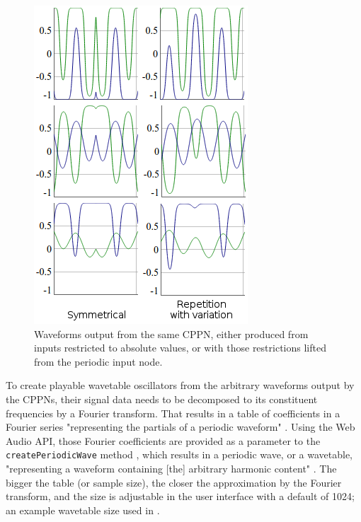 \documentclass[conference]{IEEEtran}
\begin{document}
\begin{figure}[htp]
	\centerline{\includegraphics[width=.8\columnwidth]{cppnSymmetryVsVariation.png}}
	\caption{Waveforms output from the same CPPN, either produced from inputs restricted to absolute values, or with those restrictions lifted from the periodic input node.}
	\label{fig:cppnVariation}
\end{figure}


To create playable wavetable oscillators from the arbitrary waveforms output by the CPPNs, their signal data needs to be decomposed to its constituent frequencies by a Fourier transform.  That results in a table of coefficients in a Fourier series "representing the partials of a periodic waveform" \cite{createPeriodicWave-method}.  Using the Web Audio API, those Fourier coefficients are provided as a parameter to the \texttt{createPeriodicWave} method \cite{Fourier-Transforms-Web-Audio-API}, which results in a periodic wave, or a wavetable, "representing a waveform containing [the] arbitrary harmonic content" \cite{createPeriodicWave-method}.  The bigger the table (or sample size), the closer the approximation by the Fourier transform, and the size is adjustable in the user interface with a default of 1024; an example wavetable size used in \cite{oscAndWavetablesTheory}.
\end{document}
